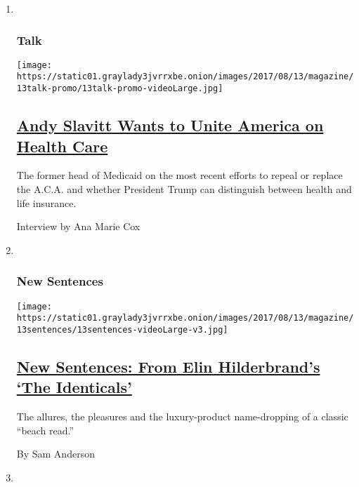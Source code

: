 \begin{enumerate}
\def\labelenumi{\arabic{enumi}.}
\item ~
  \hypertarget{talk}{%
  \subsubsection{Talk}\label{talk}}

  \texttt{[image: https://static01.graylady3jvrrxbe.onion/images/2017/08/13/magazine/13talk-promo/13talk-promo-videoLarge.jpg]}

  \hypertarget{andy-slavitt-wants-to-unite-america-on-health-care}{%
  \subsection{\texorpdfstring{\href{/2017/08/09/magazine/andy-slavitt-wants-to-unite-america-on-health-care.html}{Andy
  Slavitt Wants to Unite America on Health
  Care}}{Andy Slavitt Wants to Unite America on Health Care}}\label{andy-slavitt-wants-to-unite-america-on-health-care}}

  The former head of Medicaid on the most recent efforts to repeal or
  replace the A.C.A. and whether President Trump can distinguish between
  health and life insurance.

  Interview by Ana Marie Cox
\item ~
  \hypertarget{new-sentences}{%
  \subsubsection{New Sentences}\label{new-sentences}}

  \texttt{[image: https://static01.graylady3jvrrxbe.onion/images/2017/08/13/magazine/13sentences/13sentences-videoLarge-v3.jpg]}

  \hypertarget{new-sentences-from-elin-hilderbrands-the-identicals}{%
  \subsection{\texorpdfstring{\href{/2017/08/11/magazine/new-sentences-from-elin-hilderbrands-the-identicals.html}{New
  Sentences: From Elin Hilderbrand's `The
  Identicals'}}{New Sentences: From Elin Hilderbrand's `The Identicals'}}\label{new-sentences-from-elin-hilderbrands-the-identicals}}

  The allures, the pleasures and the luxury-product name-dropping of a
  classic ``beach read.''

  By Sam Anderson
\item ~
  \hypertarget{poem}{%
}
\end{enumerate}

